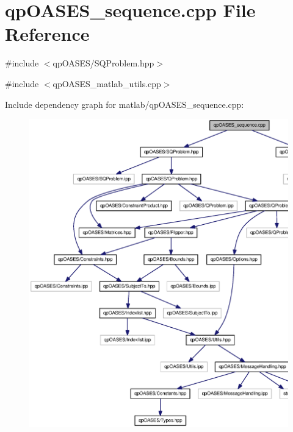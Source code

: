 \section{qpOASES\_\-sequence.cpp File Reference}
\label{matlab_2qpOASES__sequence_8cpp}
{\ttfamily \#include $<$qpOASES/SQProblem.hpp$>$}\par
{\ttfamily \#include $<$qpOASES\_\-matlab\_\-utils.cpp$>$}\par
Include dependency graph for matlab/qpOASES\_\-sequence.cpp:
\nopagebreak
\begin{figure}[H]
\begin{center}
\leavevmode
\includegraphics[width=400pt]{matlab_2qpOASES__sequence_8cpp__incl}
\end{center}
\end{figure}
